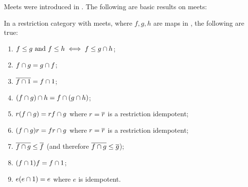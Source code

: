 Meets were introduced in \cite{cockett-guo-hofstra-2012:range2}.
The following are basic results on meets:

\begin{lemma}
  \label{lem:properties_of_meets_in_restriction_categories}
  In a restriction category \X with meets, where $f, g, h$ are maps in
  \X, the following are true:
  \begin{enumerate}[{(}i{)}]
    \item $f\le g \text{ and } f \le h \iff f \le g\cap h$;
        \label{lemsub:properties_of_meets_one}
    \item $f\cap g = g \cap f$;\label{lemsub:properties_of_meets_two}
    \item $\overline{f\cap 1} = f \cap 1$;\label{lemsub:properties_of_meets_three}
    \item $(f \cap g) \cap h = f \cap (g \cap h)$;
    \item $r(f\cap g) = r f \cap g$ where $r=\overline{r}$ is a restriction idempotent;
    \item $(f\cap g)r = f r \cap g$ where $r=\overline{r}$ is a restriction idempotent;
    \item $\overline{f\cap g} \le \overline{f}$ (and therefore $\overline{f\cap g} \le \overline{g}$);
    \item $ (f \cap 1) f = f \cap 1$;
    \item $ e(e \cap 1) = e$ where $e$ is idempotent.
  \end{enumerate}
\end{lemma}
